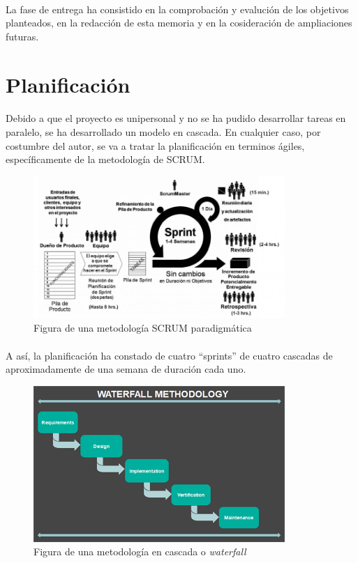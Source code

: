 \paragraph{}La fase de entrega ha consistido en la comprobación y evalución de los
objetivos planteados, en la redacción de esta memoria y en la cosideración de ampliaciones
futuras.

\section{Planificación}\label{sec:planificacion}

\paragraph{}Debido a que el proyecto es unipersonal y no se ha pudido desarrollar tareas
en paralelo, se ha desarrollado un modelo en cascada. En cualquier
caso, por costumbre del autor, se va a tratar la planificación en terminos ágiles,
específicamente de la metodología de SCRUM.

\begin{figure}[H]
    \centering
    \includegraphics[width=0.85\textwidth]{imgs/scrum}
    \caption{Figura de una metodología SCRUM paradigmática}
    \label{fig:scrum}
\end{figure}

\paragraph{}A así, la planificación ha constado de cuatro ``sprints'' de cuatro cascadas
de aproximadamente de una  semana de duración cada uno.

\begin{figure}[H]
    \centering
    \includegraphics[width=0.85\textwidth]{imgs/waterfall}
    \caption{Figura de una metodología en cascada o \emph{waterfall}}
    \label{fig:waterfall}
\end{figure}

